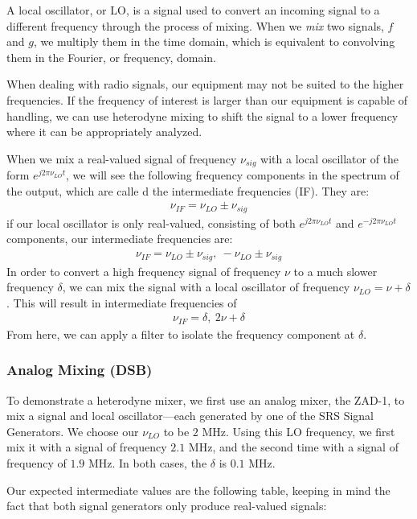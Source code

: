 \documentclass[12pt]{article}
\begin{document}
A local oscillator, or LO, is a signal used to convert an incoming signal to a different frequency through the process of mixing. When we \textit{mix} two signals, $f$ and $g$, we multiply them in the time domain, which is equivalent to convolving them in the Fourier, or frequency, domain.

When dealing with radio signals, our equipment may not be suited to the higher frequencies. If the frequency of interest is larger than our equipment is capable of handling, we can use heterodyne mixing to shift the signal to a lower frequency where it can be appropriately analyzed.

When we mix a real-valued signal of frequency $\nu_{sig}$ with a local oscillator of the form $e^{j 2\pi \nu_{LO} t}$, we will see the following frequency components in the spectrum of the output, which are calle d the intermediate frequencies (IF). They are:
\begin{eqnarray}
\nu_{IF} = \nu_{LO} \pm \nu_{sig}
\end{eqnarray}
if our local oscillator is only real-valued, consisting of both $e^{j 2\pi \nu_{LO} t}$ and $e^{-j 2\pi \nu_{LO} t}$ components, our intermediate frequencies are:
\begin{eqnarray}
\nu_{IF} = \nu_{LO} \pm \nu_{sig},\ -\nu_{LO} \pm \nu_{sig}
\end{eqnarray}
In order to convert a high frequency signal of frequency $\nu$ to a much slower frequency $\delta$, we can mix the signal with a local oscillator of frequency $\nu_{LO} = \nu + \delta$. This will result in intermediate frequencies of 
\begin{eqnarray}
\nu_{IF} = \delta,\ 2\nu + \delta \label{eq:bands}
\end{eqnarray}
From here, we can apply a filter to isolate the frequency component at $\delta$. 


\subsubsection{Analog Mixing (DSB)}
To demonstrate a heterodyne mixer, we first use an analog mixer, the ZAD-1, to mix a signal and local oscillator---each generated by one of the SRS Signal Generators. We choose our $\nu_{LO}$ to be $2$ MHz. Using this LO frequency, we first mix it with a signal of frequency $2.1$ MHz, and the second time with a signal of frequency of $1.9$ MHz. In both cases, the $\delta$ is $0.1$ MHz. 

Our expected intermediate values are the following table, keeping in mind the fact that both signal generators only produce real-valued signals:
\end{document}
